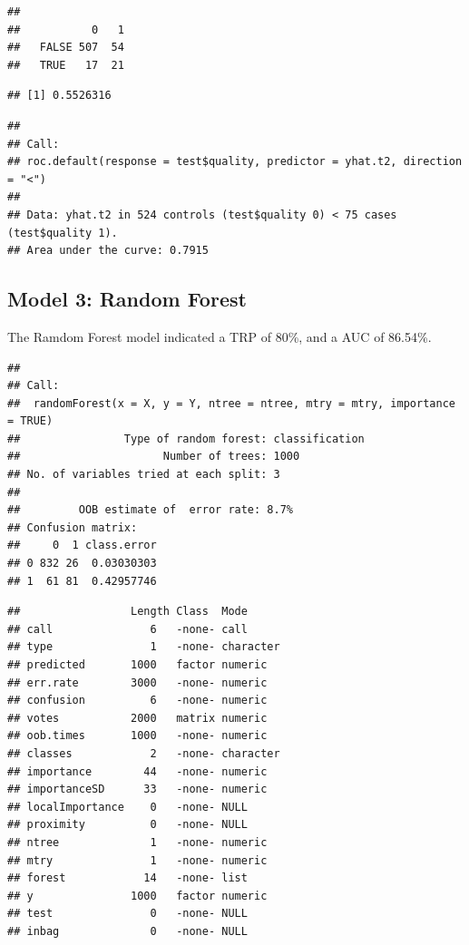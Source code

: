 \documentclass[
  english,
  man]{apa6}
\begin{document}
\begin{verbatim}
##        
##           0   1
##   FALSE 507  54
##   TRUE   17  21
\end{verbatim}

\begin{verbatim}
## [1] 0.5526316
\end{verbatim}

\begin{verbatim}
## 
## Call:
## roc.default(response = test$quality, predictor = yhat.t2, direction = "<")
## 
## Data: yhat.t2 in 524 controls (test$quality 0) < 75 cases (test$quality 1).
## Area under the curve: 0.7915
\end{verbatim}

\hypertarget{model-3-random-forest}{%
\subsection{Model 3: Random Forest}\label{model-3-random-forest}}

The Ramdom Forest model indicated a TRP of 80\%, and a AUC of 86.54\%.

\begin{verbatim}
## 
## Call:
##  randomForest(x = X, y = Y, ntree = ntree, mtry = mtry, importance = TRUE) 
##                Type of random forest: classification
##                      Number of trees: 1000
## No. of variables tried at each split: 3
## 
##         OOB estimate of  error rate: 8.7%
## Confusion matrix:
##     0  1 class.error
## 0 832 26  0.03030303
## 1  61 81  0.42957746
\end{verbatim}

\begin{verbatim}
##                 Length Class  Mode     
## call               6   -none- call     
## type               1   -none- character
## predicted       1000   factor numeric  
## err.rate        3000   -none- numeric  
## confusion          6   -none- numeric  
## votes           2000   matrix numeric  
## oob.times       1000   -none- numeric  
## classes            2   -none- character
## importance        44   -none- numeric  
## importanceSD      33   -none- numeric  
## localImportance    0   -none- NULL     
## proximity          0   -none- NULL     
## ntree              1   -none- numeric  
## mtry               1   -none- numeric  
## forest            14   -none- list     
## y               1000   factor numeric  
## test               0   -none- NULL     
## inbag              0   -none- NULL
\end{verbatim}
\end{document}
